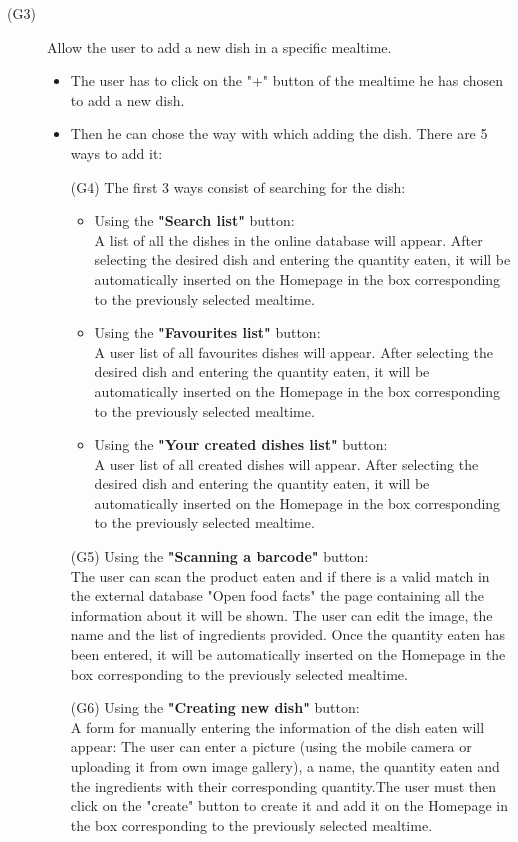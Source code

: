 \documentclass [12pt]{article}
\begin{document}
\begin{description}
\item[(G3)]Allow the user to add a new dish in a specific mealtime.
\begin{itemize}
\item The user has to click on the "+" button of the mealtime he has chosen to add a new dish.
\item  Then he can chose the way with which adding the dish. There are 5 ways to add it:\\
\item[(G4)] The first 3 ways consist of searching for the dish:
\begin{itemize}[•]
\item Using the \textbf{"Search list"} button:\\
A list of all the dishes in the online database will appear. After selecting the desired dish and entering the quantity eaten, it will be automatically inserted on the Homepage in the box corresponding to the previously selected mealtime.
\item Using the \textbf{"Favourites list"} button:\\
A user list of all favourites dishes will appear. After selecting the desired dish and entering the quantity eaten, it will be automatically inserted on the Homepage in the box corresponding to the previously selected mealtime. 
\item Using the \textbf{"Your created dishes list"} button:\\
A user list of all created dishes will appear. After selecting the desired dish and entering the quantity eaten, it will be automatically inserted on the Homepage in the box corresponding to the previously selected mealtime.
\end{itemize}

\item[(G5)] Using the \textbf{"Scanning a barcode"} button:\\
The user can scan the product eaten and if there is a valid match in the external database "Open food facts" the page containing all the information about it will be shown.  The user can edit the image, the name and the list of ingredients provided. Once the quantity eaten has been entered, it will be automatically inserted on the Homepage in the box corresponding to the previously selected mealtime.
\item[(G6)] Using the \textbf{"Creating new dish"} button:\\
A form for manually entering the information of the dish eaten will appear: 
The user can enter a picture (using the mobile camera or uploading it from own image gallery), a name, the quantity eaten and the ingredients with their corresponding quantity.The user must then click on the "create" button to create it and add it on the Homepage in the box corresponding to the previously selected mealtime. 
\end{itemize}
\end{description}
\end{document}
